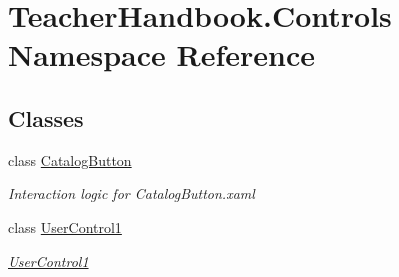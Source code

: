\hypertarget{namespace_teacher_handbook_1_1_controls}{}\section{Teacher\+Handbook.\+Controls Namespace Reference}
\label{namespace_teacher_handbook_1_1_controls}
\subsection*{Classes}
\begin{DoxyCompactItemize}
\item 
class \mbox{\hyperlink{class_teacher_handbook_1_1_controls_1_1_catalog_button}{Catalog\+Button}}
\begin{DoxyCompactList}\small\item\em Interaction logic for Catalog\+Button.\+xaml \end{DoxyCompactList}\item 
class \mbox{\hyperlink{class_teacher_handbook_1_1_controls_1_1_user_control1}{User\+Control1}}
\begin{DoxyCompactList}\small\item\em \mbox{\hyperlink{class_teacher_handbook_1_1_controls_1_1_user_control1}{User\+Control1}} \end{DoxyCompactList}\end{DoxyCompactItemize}
